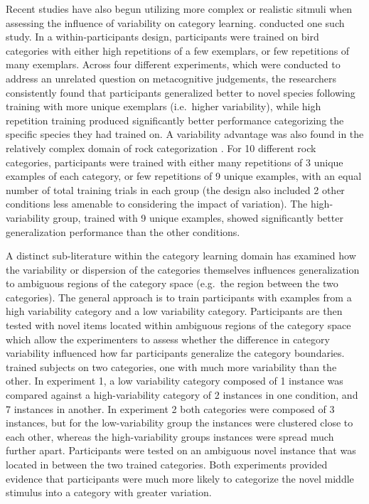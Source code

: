 \documentclass[
  12pt,
  letterpaper,
]{article}
\begin{document}
Recent studies have also begun utilizing more complex or realistic
sitmuli when assessing the influence of variability on category
learning. \textcite{wahlheimMetacognitiveJudgmentsRepetition2012}
conducted one such study. In a within-participants design, participants
were trained on bird categories with either high repetitions of a few
exemplars, or few repetitions of many exemplars. Across four different
experiments, which were conducted to address an unrelated question on
metacognitive judgements, the researchers consistently found that
participants generalized better to novel species following training with
more unique exemplars (i.e.~higher variability), while high repetition
training produced significantly better performance categorizing the
specific species they had trained on. A variability advantage was also
found in the relatively complex domain of rock categorization
\autocite{nosofskyModelguidedSearchOptimal2019}. For 10 different rock
categories, participants were trained with either many repetitions of 3
unique examples of each category, or few repetitions of 9 unique
examples, with an equal number of total training trials in each group
(the design also included 2 other conditions less amenable to
considering the impact of variation). The high-variability group,
trained with 9 unique examples, showed significantly better
generalization performance than the other conditions.

A distinct sub-literature within the category learning domain has
examined how the variability or dispersion of the categories themselves
influences generalization to ambiguous regions of the category space
(e.g.~the region between the two categories). The general approach is to
train participants with examples from a high variability category and a
low variability category. Participants are then tested with novel items
located within ambiguous regions of the category space which allow the
experimenters to assess whether the difference in category variability
influenced how far participants generalize the category boundaries.
\textcite{cohenCategoryVariabilityExemplar2001} trained subjects on two
categories, one with much more variability than the other. In experiment
1, a low variability category composed of 1 instance was compared
against a high-variability category of 2 instances in one condition, and
7 instances in another. In experiment 2 both categories were composed of
3 instances, but for the low-variability group the instances were
clustered close to each other, whereas the high-variability groups
instances were spread much further apart. Participants were tested on an
ambiguous novel instance that was located in between the two trained
categories. Both experiments provided evidence that participants were
much more likely to categorize the novel middle stimulus into a category
with greater variation.
\end{document}
